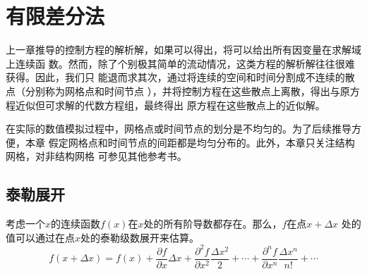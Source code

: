 \chapter{有限差分法}
上一章推导的控制方程的解析解，如果可以得出，将可以给出所有因变量在求解域上连续函
数。然而，除了个别极其简单的流动情况，这类方程的解析解往往很难获得。因此，我们只
能退而求其次，通过将连续的空间和时间分割成不连续的散点（分别称为网格点和时间节点
），并将控制方程在这些散点上离散，得出与原方程近似但可求解的代数方程组，最终得出
原方程在这些散点上的近似解。

在实际的数值模拟过程中，网格点或时间节点的划分是不均匀的。为了后续推导方便，本章
假定网格点和时间节点的间距都是均匀分布的。此外，本章只关注结构网格，对非结构网格
可参见其他参考书。

\section{泰勒展开}
考虑一个$x$的连续函数$f(x)$在$x$处的所有阶导数都存在。那么，$f$在点$x+\Delta x$
处的值可以通过在点$x$处的泰勒级数展开来估算。
\begin{equation}
  f(x+\Delta x)
  =
  f(x)
  +
  \frac{\partial f}{\partial x}\Delta x
  +
  \frac{\partial^{2} f}{\partial x^{2}}\frac{\Delta x^{2}}{2}
  +
  \cdots
  +
  \frac{\partial^{n} f}{\partial x^{n}}\frac{\Delta x^{n}}{n!}
  +
  \cdots
\end{equation}

